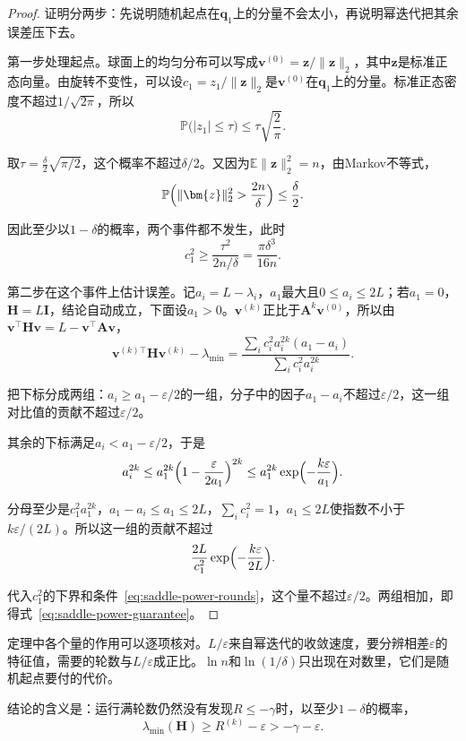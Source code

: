 \begin{proof}
 证明分两步：先说明随机起点在$\bm{q}_1$上的分量不会太小，再说明幂迭代把其余误差压下去。

 第一步处理起点。球面上的均匀分布可以写成$\bm{v}^{(0)}=\bm{z}/\lVert\bm{z}\rVert_2$，其中$\bm{z}$是标准正态向量。由旋转不变性，可以设$c_1=z_1/\lVert\bm{z}\rVert_2$是$\bm{v}^{(0)}$在$\bm{q}_1$上的分量。标准正态密度不超过$1/\sqrt{2\pi}$，所以
 \[
  \mathbb{P}\bigl(\lvert z_1\rvert\leq\tau\bigr)\leq\tau\sqrt{\frac{2}{\pi}}.
 \]

 取$\tau=\tfrac{\delta}{2}\sqrt{\pi/2}$，这个概率不超过$\delta/2$。又因为$\mathbb{E}\lVert\bm{z}\rVert_2^2=n$，由Markov不等式，
 \[
  \mathbb{P}\Bigl(\lVert\bm{z}\rVert_2^2>\frac{2n}{\delta}\Bigr)\leq\frac{\delta}{2}.
 \]

 因此至少以$1-\delta$的概率，两个事件都不发生，此时
 \[
  c_1^2\geq\frac{\tau^2}{2n/\delta}=\frac{\pi\delta^3}{16n}.
 \]

 第二步在这个事件上估计误差。记$a_i=L-\lambda_i$，$a_1$最大且$0\leq a_i\leq2L$；若$a_1=0$，$\bm{H}=L\bm{I}$，结论自动成立，下面设$a_1>0$。$\bm{v}^{(k)}$正比于$\bm{A}^k\bm{v}^{(0)}$，所以由$\bm{v}^\top\bm{H}\bm{v}=L-\bm{v}^\top\bm{A}\bm{v}$，
 \[
  \bm{v}^{(k)\top}\bm{H}\bm{v}^{(k)}-\lambda_{\min}
  =\frac{\sum_ic_i^2a_i^{2k}(a_1-a_i)}{\sum_ic_i^2a_i^{2k}}.
 \]

 把下标分成两组：$a_i\geq a_1-\varepsilon/2$的一组，分子中的因子$a_1-a_i$不超过$\varepsilon/2$，这一组对比值的贡献不超过$\varepsilon/2$。

 其余的下标满足$a_i<a_1-\varepsilon/2$，于是
 \[
  a_i^{2k}\leq a_1^{2k}\Bigl(1-\frac{\varepsilon}{2a_1}\Bigr)^{2k}
  \leq a_1^{2k}\exp\Bigl(-\frac{k\varepsilon}{a_1}\Bigr).
 \]

 分母至少是$c_1^2a_1^{2k}$，$a_1-a_i\leq a_1\leq2L$，$\sum_ic_i^2=1$，$a_1\leq2L$使指数不小于$k\varepsilon/(2L)$。所以这一组的贡献不超过
 \[
  \frac{2L}{c_1^2}\exp\Bigl(-\frac{k\varepsilon}{2L}\Bigr).
 \]

 代入$c_1^2$的下界和条件~\eqref{eq:saddle-power-rounds}，这个量不超过$\varepsilon/2$。两组相加，即得式~\eqref{eq:saddle-power-guarantee}。
\end{proof}

定理中各个量的作用可以逐项核对。$L/\varepsilon$来自幂迭代的收敛速度，要分辨相差$\varepsilon$的特征值，需要的轮数与$L/\varepsilon$成正比。$\ln n$和$\ln(1/\delta)$只出现在对数里，它们是随机起点要付的代价。

结论的含义是：运行满轮数仍然没有发现$R\leq-\gamma$时，以至少$1-\delta$的概率，
\begin{equation}
 \lambda_{\min}(\bm{H})\geq R^{(k)}-\varepsilon>-\gamma-\varepsilon.
 \label{eq:saddle-no-find}
\end{equation}

